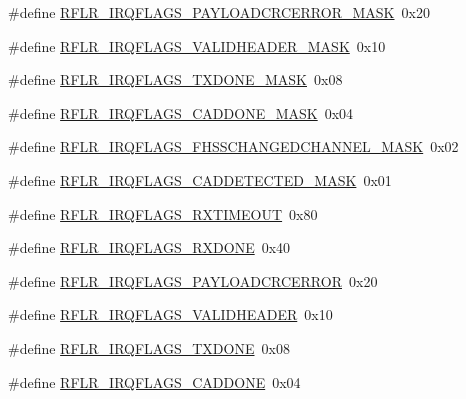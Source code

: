 \begin{DoxyCompactItemize}
\item 
\#define \mbox{\hyperlink{sx1276_regs-_lo_ra_8h_a4e2618c340d93f8bfd19f8634f7a63b3}{R\+F\+L\+R\+\_\+\+I\+R\+Q\+F\+L\+A\+G\+S\+\_\+\+P\+A\+Y\+L\+O\+A\+D\+C\+R\+C\+E\+R\+R\+O\+R\+\_\+\+M\+A\+SK}}~0x20
\item 
\#define \mbox{\hyperlink{sx1276_regs-_lo_ra_8h_a7d3583b774d3514d985a6f8acb6cd7c7}{R\+F\+L\+R\+\_\+\+I\+R\+Q\+F\+L\+A\+G\+S\+\_\+\+V\+A\+L\+I\+D\+H\+E\+A\+D\+E\+R\+\_\+\+M\+A\+SK}}~0x10
\item 
\#define \mbox{\hyperlink{sx1276_regs-_lo_ra_8h_adeb3e1c7ad35e4b4ab4ea7cd9050c2e6}{R\+F\+L\+R\+\_\+\+I\+R\+Q\+F\+L\+A\+G\+S\+\_\+\+T\+X\+D\+O\+N\+E\+\_\+\+M\+A\+SK}}~0x08
\item 
\#define \mbox{\hyperlink{sx1276_regs-_lo_ra_8h_a5af8031790e4a1d7c3703fb4f834b21d}{R\+F\+L\+R\+\_\+\+I\+R\+Q\+F\+L\+A\+G\+S\+\_\+\+C\+A\+D\+D\+O\+N\+E\+\_\+\+M\+A\+SK}}~0x04
\item 
\#define \mbox{\hyperlink{sx1276_regs-_lo_ra_8h_ae0250cb5809f0702a43eb235823acc44}{R\+F\+L\+R\+\_\+\+I\+R\+Q\+F\+L\+A\+G\+S\+\_\+\+F\+H\+S\+S\+C\+H\+A\+N\+G\+E\+D\+C\+H\+A\+N\+N\+E\+L\+\_\+\+M\+A\+SK}}~0x02
\item 
\#define \mbox{\hyperlink{sx1276_regs-_lo_ra_8h_a0d8e41b65bd4af8f19dfad50b7dcad97}{R\+F\+L\+R\+\_\+\+I\+R\+Q\+F\+L\+A\+G\+S\+\_\+\+C\+A\+D\+D\+E\+T\+E\+C\+T\+E\+D\+\_\+\+M\+A\+SK}}~0x01
\item 
\#define \mbox{\hyperlink{sx1276_regs-_lo_ra_8h_a12d5b2ce439396e7033053c929b815bf}{R\+F\+L\+R\+\_\+\+I\+R\+Q\+F\+L\+A\+G\+S\+\_\+\+R\+X\+T\+I\+M\+E\+O\+UT}}~0x80
\item 
\#define \mbox{\hyperlink{sx1276_regs-_lo_ra_8h_a7bdc1e0f642b272cef8fc3f81ab8d95e}{R\+F\+L\+R\+\_\+\+I\+R\+Q\+F\+L\+A\+G\+S\+\_\+\+R\+X\+D\+O\+NE}}~0x40
\item 
\#define \mbox{\hyperlink{sx1276_regs-_lo_ra_8h_a2b91f96d488f7d08d8fd543a7a5eb76b}{R\+F\+L\+R\+\_\+\+I\+R\+Q\+F\+L\+A\+G\+S\+\_\+\+P\+A\+Y\+L\+O\+A\+D\+C\+R\+C\+E\+R\+R\+OR}}~0x20
\item 
\#define \mbox{\hyperlink{sx1276_regs-_lo_ra_8h_a56f64bf676430c4ce2cc672d3bfde2b8}{R\+F\+L\+R\+\_\+\+I\+R\+Q\+F\+L\+A\+G\+S\+\_\+\+V\+A\+L\+I\+D\+H\+E\+A\+D\+ER}}~0x10
\item 
\#define \mbox{\hyperlink{sx1276_regs-_lo_ra_8h_a15a27d43d8ec6b82bcd31857c35e9f09}{R\+F\+L\+R\+\_\+\+I\+R\+Q\+F\+L\+A\+G\+S\+\_\+\+T\+X\+D\+O\+NE}}~0x08
\item 
\#define \mbox{\hyperlink{sx1276_regs-_lo_ra_8h_a44fee83993ca42bbd77370fc82c2fc91}{R\+F\+L\+R\+\_\+\+I\+R\+Q\+F\+L\+A\+G\+S\+\_\+\+C\+A\+D\+D\+O\+NE}}~0x04

\end{DoxyCompactItemize}
